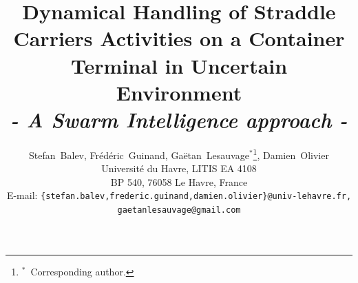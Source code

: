 \documentclass[journal]{IEEEtran}
\begin{document}
%
\title{Dynamical Handling of Straddle Carriers Activities on a Container
Terminal in Uncertain Environment \\ \textit{- A Swarm Intelligence approach -}}
%
%
%

\author{
Stefan~Balev, Fr\'{e}d\'{e}ric~Guinand,
Ga\"{e}tan~Lesauvage$^*$\thanks{$^*$~Corresponding author.}, Damien~Olivier\\
\medskip
Universit\'{e} du Havre, LITIS EA 4108\\
BP 540, 76058 Le Havre, France\\
\medskip
E-mail:
\texttt{\{stefan.balev,frederic.guinand,damien.olivier\}@univ-lehavre.fr,
gaetanlesauvage@gmail.com}
}

%
%



%
\end{document}
